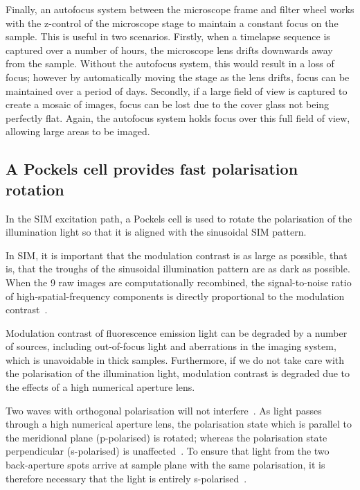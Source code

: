Finally, an autofocus system between the microscope frame and filter wheel works with the z-control of the microscope stage to maintain a constant focus on the sample. 
This is useful in two scenarios. 
Firstly, when a timelapse sequence is captured over a number of hours, the microscope lens drifts downwards away from the sample. 
Without the autofocus system, this would result in a loss of focus; however by automatically moving the stage as the lens drifts, focus can be maintained over a period of days.
Secondly, if a large field of view is captured to create a mosaic of images, focus can be lost due to the cover glass not being perfectly flat. 
Again, the autofocus system holds focus over this full field of view, allowing large areas to be imaged. 


\subsection{A Pockels cell provides fast polarisation rotation} \label{sec:lagsim-pockels}
In the SIM excitation path, a Pockels cell is used to rotate the polarisation of the illumination light so that it is aligned with the sinusoidal SIM pattern. 

In SIM, it is important that the modulation contrast is as large as possible, that is, that the troughs of the sinusoidal illumination pattern are as dark as possible.
When the 9 raw images are computationally recombined, the signal-to-noise ratio of high-spatial-frequency components is directly proportional to the modulation contrast~\cite{oholleran2012polarization}.

Modulation contrast of fluorescence emission light can be degraded by a number of sources, including out-of-focus light and aberrations in the imaging system, which is unavoidable in thick samples. 
Furthermore, if we do not take care with the polarisation of the illumination light,  modulation contrast is degraded due to the effects of a high numerical aperture lens. 

Two waves with orthogonal polarisation will not interfere~\cite{nityananda2013interference}. 
As light passes through a high numerical aperture lens, the polarisation state which is parallel to the meridional plane (p-polarised) is rotated; whereas the polarisation state perpendicular (s-polarised) is unaffected~\cite{mansuripur1991effects}. 
To ensure that light from the two back-aperture spots arrive at sample plane with the same polarisation, it is therefore necessary that the light is entirely s-polarised~\cite{oholleran2012polarization}. 


